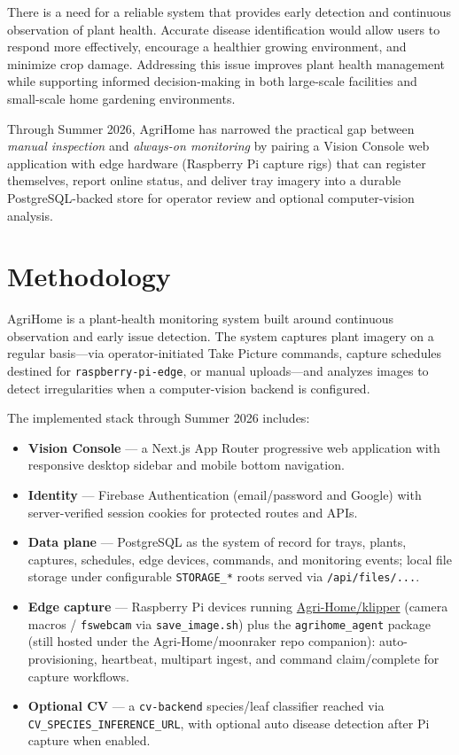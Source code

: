 \documentclass[11pt,letterpaper]{article}
\begin{document}
There is a need for a reliable system that provides early detection and continuous observation of plant
health. Accurate disease identification would allow users to respond more effectively, encourage a
healthier growing environment, and minimize crop damage. Addressing this issue improves plant
health management while supporting informed decision-making in both large-scale facilities and
small-scale home gardening environments.

Through Summer 2026, AgriHome has narrowed the practical gap between \emph{manual inspection}
and \emph{always-on monitoring} by pairing a Vision Console web application with edge hardware
(Raspberry Pi capture rigs) that can register themselves, report online status, and deliver tray imagery
into a durable PostgreSQL-backed store for operator review and optional computer-vision analysis.

\section{Methodology}
AgriHome is a plant-health monitoring system built around continuous observation and early issue
detection. The system captures plant imagery on a regular basis---via operator-initiated Take Picture
commands, capture schedules destined for \texttt{raspberry-pi-edge}, or manual uploads---and analyzes
images to detect irregularities when a computer-vision backend is configured.

The implemented stack through Summer 2026 includes:
\begin{itemize}
  \item \textbf{Vision Console} --- a Next.js App Router progressive web application with responsive
        desktop sidebar and mobile bottom navigation.
  \item \textbf{Identity} --- Firebase Authentication (email/password and Google) with server-verified
        session cookies for protected routes and APIs.
  \item \textbf{Data plane} --- PostgreSQL as the system of record for trays, plants, captures, schedules,
        edge devices, commands, and monitoring events; local file storage under configurable
        \texttt{STORAGE\_*} roots served via \texttt{/api/files/...}.
  \item \textbf{Edge capture} --- Raspberry Pi devices running
        \href{https://github.com/Agri-Home/klipper}{Agri-Home/klipper} (camera macros /
        \texttt{fswebcam} via \texttt{save\_image.sh}) plus the \texttt{agrihome\_agent} package
        (still hosted under the Agri-Home/moonraker repo companion): auto-provisioning, heartbeat,
        multipart ingest, and command claim/complete for capture workflows.
  \item \textbf{Optional CV} --- a \texttt{cv-backend} species/leaf classifier reached via
        \texttt{CV\_SPECIES\_INFERENCE\_URL}, with optional auto disease detection after Pi capture when
        enabled.
\end{itemize}
\end{document}
